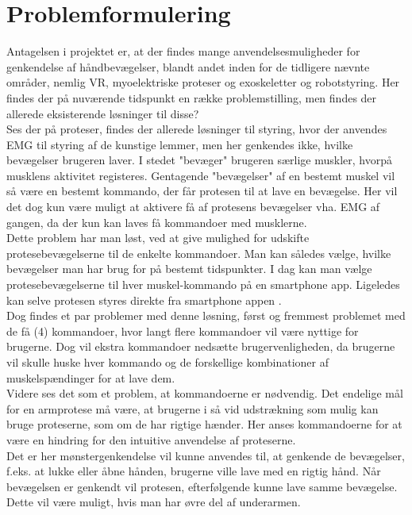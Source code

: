 \thispagestyle{fancy}
\chapter{Problemformulering}
\label{chp:problemformulering}

Antagelsen i projektet er, at der findes mange anvendelsesmuligheder for genkendelse af håndbevægelser, blandt andet inden for de tidligere nævnte områder, nemlig VR, myoelektriske proteser og exoskeletter og robotstyring. Her findes der på nuværende tidspunkt en række problemstilling, men findes der allerede eksisterende løsninger til disse?\\

Ses der på proteser, findes der allerede løsninger til styring, hvor der anvendes EMG til styring af de kunstige lemmer, men her genkendes ikke, hvilke bevægelser brugeren laver. I stedet "bevæger" brugeren særlige muskler, hvorpå musklens aktivitet registeres. Gentagende "bevægelser" af en bestemt muskel vil så være en bestemt kommando, der får protesen til at lave en bevægelse. Her vil det dog kun være muligt at aktivere få af protesens bevægelser vha. EMG af gangen, da der kun kan laves få kommandoer med musklerne. \\

Dette problem har man løst, ved at give mulighed for udskifte protesebevægelserne til de enkelte kommandoer. Man kan således vælge, hvilke bevægelser man har brug for på bestemt tidspunkter. I dag kan man vælge protesebevægelserne til hver muskel-kommando på en smartphone app. Ligeledes kan selve protesen styres direkte fra smartphone appen \citep{RefWorks:12}.\\
Dog findes et par problemer med denne løsning, først og fremmest problemet med de få (4) kommandoer, hvor langt flere kommandoer vil være nyttige for brugerne. Dog vil ekstra kommandoer nedsætte brugervenligheden, da brugerne vil skulle huske hver kommando og de forskellige kombinationer af muskelspændinger for at lave dem.\\

Videre ses det som et problem, at kommandoerne er nødvendig. Det endelige mål for en armprotese må være, at brugerne i så vid udstrækning som mulig kan bruge proteserne, som om de har rigtige hænder. Her anses kommandoerne for at være en hindring for den intuitive anvendelse af proteserne.\\

Det er her mønstergenkendelse vil kunne anvendes til, at genkende de bevægelser, f.eks. at lukke eller åbne hånden, brugerne ville lave med en rigtig hånd. Når bevægelsen er genkendt vil protesen, efterfølgende kunne lave samme bevægelse. Dette vil være muligt, hvis man har øvre del af underarmen. \\

